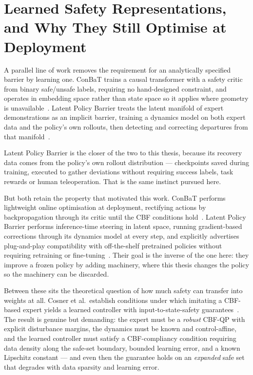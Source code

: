\section{Learned Safety Representations, and Why They Still Optimise at Deployment}
\label{sec:bg:learned}

A parallel line of work removes the requirement for an analytically specified barrier by learning
one. ConBaT trains a causal transformer with a safety critic from binary safe/unsafe labels,
requiring no hand-designed constraint, and operates in embedding space rather than state space so
it applies where geometry is unavailable~\cite{meng2024conbat}. Latent Policy Barrier treats the
latent manifold of expert demonstrations as an implicit barrier, training a dynamics model on both
expert data and the policy's own rollouts, then detecting and correcting departures from that
manifold~\cite{sun2025lpb}.

Latent Policy Barrier is the closer of the two to this thesis, because its recovery data comes from
the policy's own rollout distribution --- checkpoints saved during training, executed to gather
deviations without requiring success labels, task rewards or human teleoperation. That is the same
instinct pursued here.

But both retain the property that motivated this work. ConBaT performs lightweight online
optimisation at deployment, rectifying actions by backpropagation through its critic until the CBF
conditions hold~\cite{meng2024conbat}. Latent Policy Barrier performs inference-time steering in
latent space, running gradient-based corrections through its dynamics model at every step, and
explicitly advertises plug-and-play compatibility with off-the-shelf pretrained policies without
requiring retraining or fine-tuning~\cite{sun2025lpb}. Their goal is the inverse of the one here:
they improve a frozen policy by adding machinery, where this thesis changes the policy so the
machinery can be discarded.

Between these sits the theoretical question of how much safety can transfer into weights at all.
Cosner et al.\ establish conditions under which imitating a CBF-based expert yields a learned
controller with input-to-state-safety guarantees~\cite{cosner2022il_cbf}. The result is genuine but
demanding: the expert must be a \emph{robust} CBF-QP with explicit disturbance margins, the
dynamics must be known and control-affine, and the learned controller must satisfy a
CBF-compliancy condition requiring data density along the safe-set boundary, bounded learning
error, and a known Lipschitz constant --- and even then the guarantee holds on an \emph{expanded}
safe set that degrades with data sparsity and learning error.

